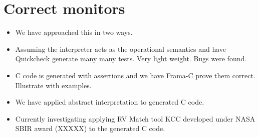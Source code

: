 \section{Correct monitors} \label{sec:codecorrect} 

\noindent{}
\begin{itemize}
\item We have approached this in two ways. 
\item Assuming the interpreter acts as the operational semantics and
  have Quickcheck generate many many tests. Very light weight. Bugs
  were found. 
\item C code is generated with assertions and we have Frama-C prove
  them correct.  Illustrate with examples. 
\end{itemize} 

\noindent{}

\begin{itemize}
\item We have applied abstract interpretation to generated C code.
\item Currently investigating applying RV Match tool KCC developed
  under NASA SBIR award (XXXXX)  to the
  generated C code. 
\end{itemize}
